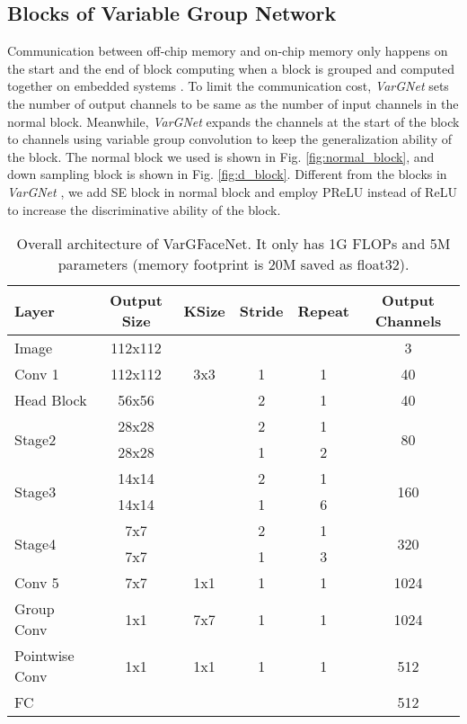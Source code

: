 \documentclass[10pt,twocolumn,letterpaper]{article}
\begin{document}
\subsection{Blocks of Variable Group Network}

Communication between off-chip memory and on-chip memory only happens on the start and the end of block computing when a block is grouped and computed together on  embedded systems \cite{xing2019dnnvm}. To limit the communication cost, \textit{VarGNet} sets the number of output channels to be same as the number of input channels in the normal block. Meanwhile, \textit{VarGNet} expands the  channels at the start of the block to  channels  using variable group convolution to keep the generalization ability of the block. The normal block we used is shown in Fig. \ref{fig:normal_block}, and down sampling block is shown in Fig. \ref{fig:d_block}. Different from the blocks in \textit{VarGNet} \cite{vargnet}, we add SE block in normal block and employ PReLU instead of ReLU to increase the discriminative ability of the block.

\begin{table*}[htb]
	\begin{center}
		\setlength{\tabcolsep}{7mm}
		\begin{tabular}{l|c|c|c|c|c}			
			\hline
			\hline
			Layer & Output Size & KSize & Stride & Repeat & Output Channels \\
			\hline
			Image & 112x112 & {} & {} & {} & 3 \\
			\hline
			Conv 1 & 112x112 & 3x3 & 1 & 1 & 40 \\
			\hline
			Head Block & 56x56 & {} & 2 & 1 & 40 \\
			\hline
			\multirow{2}{*}{Stage2} & 28x28 & {} & 2 & 1 & \multirow{2}{*}{80} \\
			\cline{2-5}
			& 28x28 & {} & 1 & 2 & {} \\
			\hline
			\multirow{2}{*}{Stage3} & 14x14 & {} & 2 & 1 & \multirow{2}{*}{160} \\
			\cline{2-5}
			& 14x14 & {} & 1 & 6 & {} \\			
			\hline
			\multirow{2}{*}{Stage4} & 7x7 & {} & 2 & 1 & \multirow{2}{*}{320} \\
			\cline{2-5}
			& 7x7 & {} & 1 & 3 & {} \\
			\hline
			Conv 5 & 7x7 & 1x1 & 1 & 1 & 1024 \\
			\hline
			Group Conv & 1x1 & 7x7 & 1 & 1 & 1024 \\
			\hline
			Pointwise Conv & 1x1 & 1x1 & 1 & 1 & 512 \\
			\hline
			FC & {} & {} & {} & {} & 512 \\
			\hline
			\hline
		\end{tabular}
	\end{center}
	\caption{Overall architecture of VarGFaceNet. It only has 1G FLOPs and 5M parameters (memory footprint is 20M saved as float32).}
	\label{tab:vargfacenet}
\end{table*}
\end{document}
